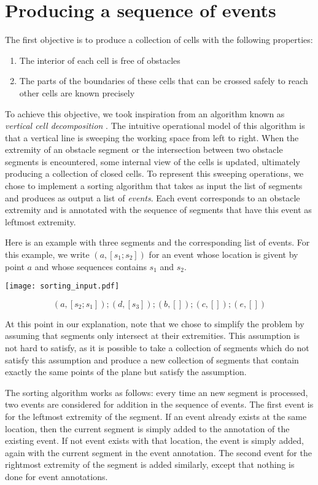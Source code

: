 \documentclass{easychair}
\begin{document}
\section{Producing a sequence of events}
The first objective is to produce a collection of cells with the following
properties:
\begin{enumerate}
\item The interior of each cell is free of obstacles
\item The parts of the boundaries of these cells that can be crossed
  safely to reach other cells are known precisely
\end{enumerate}
To achieve this objective, we took inspiration from an algorithm known as
{\em vertical cell decomposition} \cite{Latombe91}.  The intuitive
operational model of this algorithm is that a vertical line is
sweeping the working space from left to right.  When the extremity of
an obstacle segment or the intersection between two obstacle segments
is encountered, some internal view of the cells is updated, ultimately
producing a collection of closed cells.  To represent this sweeping
operations, we chose to implement a sorting algorithm that takes as
input the list of segments and produces as output a list of {\em
  events}.  Each event corresponds to an obstacle extremity and is
annotated with the sequence of segments that have this event as
leftmost extremity.

Here is an example with three segments and the corresponding list of events.
For this example, we write \((a, [s_1;s_2])\) for an event whose location is
givent by point \(a\) and whose sequences contains \(s_1\) and \(s_2\).

\begin{center}
\texttt{[image: sorting\_input.pdf]}
\end{center}
\[ (a, [s_2; s_1]); (d, [s_3]); (b, []); (c, []); (e,[])\]



At this point in our explanation, note that we chose to
simplify the problem by assuming that segments only intersect at their
extremities.  This assumption is not hard
to satisfy, as it is possible to take a collection of segments which
do not satisfy this assumption and produce a new collection of
segments that contain exactly the same points of the plane but satisfy
the assumption.

The sorting algorithm works as follows: every time an new segment is
processed, two events are considered for addition in the sequence of events.
The first event is for the leftmost extremity of the segment.  If an
event already exists at the same location, then the current segment is
simply added to the annotation of the existing event.  If not event exists
with that location, the event is simply added, again with the current segment
in the event annotation.  The second event for the rightmost extremity of the
segment is added similarly, except that nothing is done for event annotations.
\end{document}
